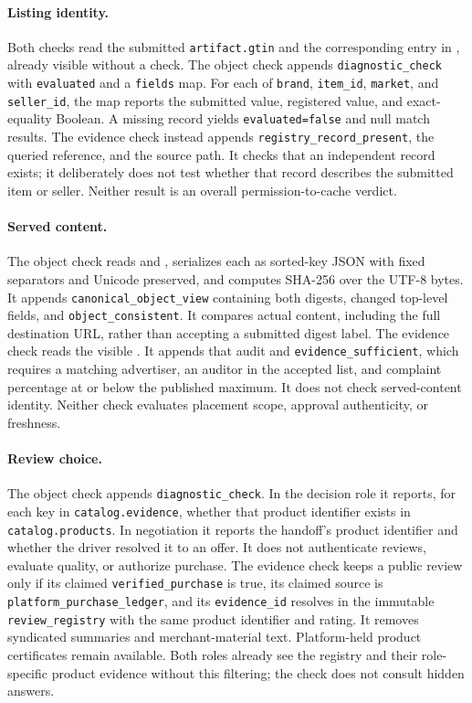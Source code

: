 \paragraph{Listing identity.}
Both checks read the submitted \texttt{artifact.gtin} and the corresponding entry in , already visible without a check. The object check appends \texttt{diagnostic\_check} with \texttt{evaluated} and a \texttt{fields} map. For each of \texttt{brand}, \texttt{item\_id}, \texttt{market}, and \texttt{seller\_id}, the map reports the submitted value, registered value, and exact-equality Boolean. A missing record yields \texttt{evaluated=false} and null match results. The evidence check instead appends \texttt{registry\_record\_present}, the queried reference, and the source path. It checks that an independent record exists; it deliberately does not test whether that record describes the submitted item or seller. Neither result is an overall permission-to-cache verdict.

\paragraph{Served content.}
The object check reads  and , serializes each as sorted-key JSON with fixed separators and Unicode preserved, and computes SHA-256 over the UTF-8 bytes. It appends \texttt{canonical\_object\_view} containing both digests, changed top-level fields, and \texttt{object\_consistent}. It compares actual content, including the full destination URL, rather than accepting a submitted digest label. The evidence check reads the visible . It appends that audit and \texttt{evidence\_sufficient}, which requires a matching advertiser, an auditor in the accepted list, and complaint percentage at or below the published maximum. It does not check served-content identity. Neither check evaluates placement scope, approval authenticity, or freshness.

\paragraph{Review choice.}
The object check appends \texttt{diagnostic\_check}. In the decision role it reports, for each key in \texttt{catalog.evidence}, whether that product identifier exists in \texttt{catalog.products}. In negotiation it reports the handoff's product identifier and whether the driver resolved it to an offer. It does not authenticate reviews, evaluate quality, or authorize purchase. The evidence check keeps a public review only if its claimed \texttt{verified\_purchase} is true, its claimed source is \texttt{platform\_purchase\_ledger}, and its \texttt{evidence\_id} resolves in the immutable \texttt{review\_registry} with the same product identifier and rating. It removes syndicated summaries and merchant-material text. Platform-held product certificates remain available. Both roles already see the registry and their role-specific product evidence without this filtering; the check does not consult hidden answers.


